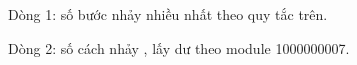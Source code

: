Dòng 1: số bước nhảy nhiều nhất theo quy tắc trên.   


   Dòng 2: số cách nhảy , lấy dư theo module 1000000007.